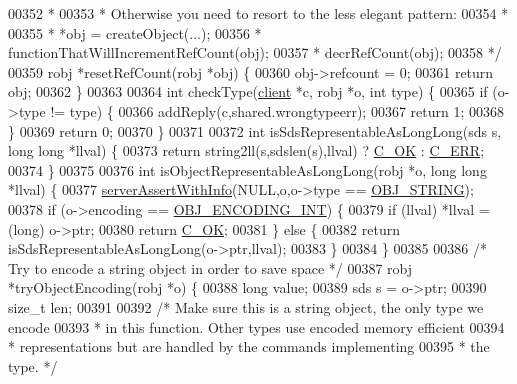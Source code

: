 \begin{DoxyCode}
00352 \textcolor{comment}{ *}
00353 \textcolor{comment}{ * Otherwise you need to resort to the less elegant pattern:}
00354 \textcolor{comment}{ *}
00355 \textcolor{comment}{ *    *obj = createObject(...);}
00356 \textcolor{comment}{ *    functionThatWillIncrementRefCount(obj);}
00357 \textcolor{comment}{ *    decrRefCount(obj);}
00358 \textcolor{comment}{ */}
00359 robj *resetRefCount(robj *obj) \{
00360     obj->refcount = 0;
00361     \textcolor{keywordflow}{return} obj;
00362 \}
00363 
00364 \textcolor{keywordtype}{int} checkType(\hyperlink{structclient}{client} *c, robj *o, \textcolor{keywordtype}{int} type) \{
00365     \textcolor{keywordflow}{if} (o->type != type) \{
00366         addReply(c,shared.wrongtypeerr);
00367         \textcolor{keywordflow}{return} 1;
00368     \}
00369     \textcolor{keywordflow}{return} 0;
00370 \}
00371 
00372 \textcolor{keywordtype}{int} isSdsRepresentableAsLongLong(sds s, \textcolor{keywordtype}{long} \textcolor{keywordtype}{long} *llval) \{
00373     \textcolor{keywordflow}{return} string2ll(s,sdslen(s),llval) ? \hyperlink{server_8h_a303769ef1065076e68731584e758d3e1}{C\_OK} : \hyperlink{server_8h_af98ac28d5f4d23d7ed5985188e6fb7d1}{C\_ERR};
00374 \}
00375 
00376 \textcolor{keywordtype}{int} isObjectRepresentableAsLongLong(robj *o, \textcolor{keywordtype}{long} \textcolor{keywordtype}{long} *llval) \{
00377     \hyperlink{server_8h_a7308f76cbff9a8d3797fe78190b91282}{serverAssertWithInfo}(NULL,o,o->type == \hyperlink{server_8h_a65236ea160f69cdef33ec942092af88f}{OBJ\_STRING});
00378     \textcolor{keywordflow}{if} (o->encoding == \hyperlink{server_8h_ae934cf008a0be0ef009c92c2d006a816}{OBJ\_ENCODING\_INT}) \{
00379         \textcolor{keywordflow}{if} (llval) *llval = (\textcolor{keywordtype}{long}) o->ptr;
00380         \textcolor{keywordflow}{return} \hyperlink{server_8h_a303769ef1065076e68731584e758d3e1}{C\_OK};
00381     \} \textcolor{keywordflow}{else} \{
00382         \textcolor{keywordflow}{return} isSdsRepresentableAsLongLong(o->ptr,llval);
00383     \}
00384 \}
00385 
00386 \textcolor{comment}{/* Try to encode a string object in order to save space */}
00387 robj *tryObjectEncoding(robj *o) \{
00388     \textcolor{keywordtype}{long} value;
00389     sds s = o->ptr;
00390     size\_t len;
00391 
00392     \textcolor{comment}{/* Make sure this is a string object, the only type we encode}
00393 \textcolor{comment}{     * in this function. Other types use encoded memory efficient}
00394 \textcolor{comment}{     * representations but are handled by the commands implementing}
00395 \textcolor{comment}{     * the type. */}

\end{DoxyCode}
